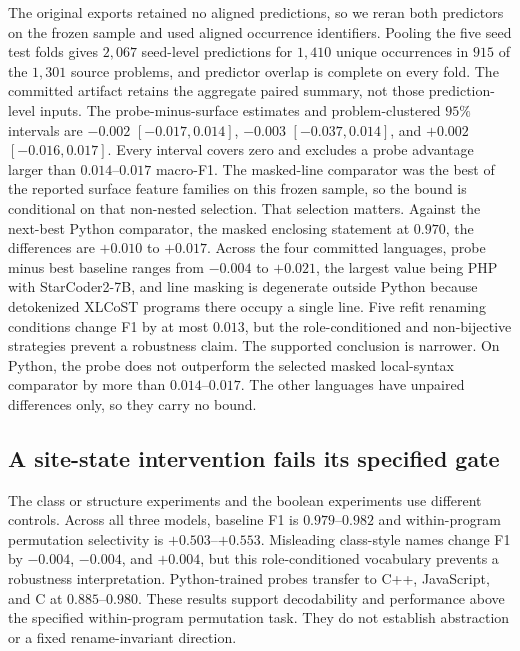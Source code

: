 \documentclass{article}
\begin{document}
The original exports retained no aligned predictions, so we reran both
predictors on the frozen sample and used aligned occurrence identifiers.
Pooling the five seed test folds gives $2{,}067$ seed-level predictions for
$1{,}410$ unique occurrences in $915$ of the $1{,}301$ source problems, and
predictor overlap is complete on every fold. The committed artifact retains the
aggregate paired summary, not those prediction-level inputs. The
probe-minus-surface estimates and problem-clustered $95\%$ intervals are
$-0.002$ $[-0.017, 0.014]$, $-0.003$ $[-0.037, 0.014]$, and $+0.002$
$[-0.016, 0.017]$. Every interval covers zero and excludes a probe advantage
larger than $0.014$--$0.017$ macro-F1. The masked-line comparator was the best
of the reported surface feature families on this frozen sample, so the bound
is conditional on that non-nested selection. That selection matters. Against
the next-best Python comparator, the masked enclosing statement at $0.970$,
the differences are $+0.010$ to $+0.017$. Across the four committed languages,
probe minus best baseline ranges from $-0.004$ to $+0.021$, the largest value
being PHP with StarCoder2-7B, and line masking is degenerate outside Python
because detokenized XLCoST programs there occupy a single line.
Five refit renaming conditions
change F1 by at most $0.013$, but the role-conditioned and non-bijective
strategies prevent a robustness claim. The supported conclusion is narrower.
On Python, the probe does not outperform the selected masked local-syntax
comparator by more than $0.014$--$0.017$. The other languages have unpaired
differences only, so they carry no bound.

\subsection{A site-state intervention fails its specified gate}

The class or structure experiments and the boolean experiments use different
controls. Across all three models, baseline F1 is $0.979$--$0.982$ and within-program permutation
selectivity is
$+0.503$--$+0.553$. Misleading class-style names change F1 by
$-0.004$, $-0.004$, and $+0.004$, but this role-conditioned vocabulary
prevents a robustness interpretation. Python-trained probes transfer to C++,
JavaScript, and C at $0.885$--$0.980$. These results support decodability and
performance above the specified within-program permutation task. They do not
establish abstraction or a fixed rename-invariant direction.
\end{document}
